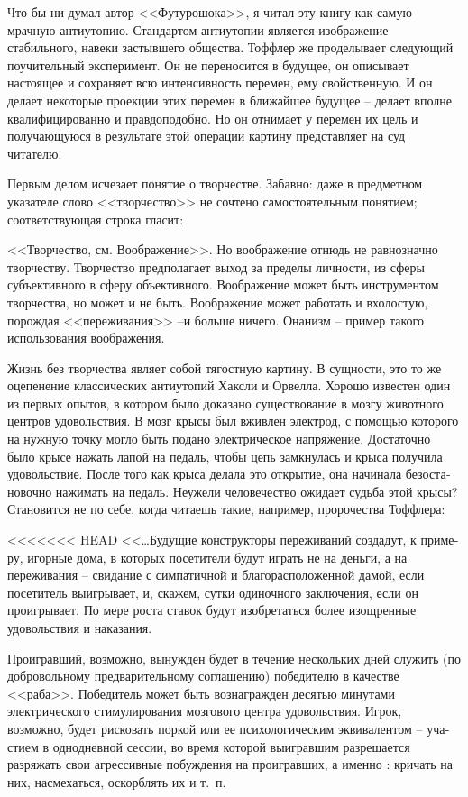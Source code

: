 \documentclass{book}
\begin{document}
{Что бы ни думал автор <<Футурошока>>, я читал эту книгу как самую мрачную антиутопию. Стандартом антиутопии являет­ся изображение стабильного, навеки застывшего общества. Тоффлер же проделывает следующий поучительный экспери­мент. Он не переносится в будущее, он описывает настоящее и сохраняет всю интенсивность перемен, ему свойственную. И он делает некоторые проекции этих перемен в ближайшее буду­щее -- делает вполне квалифицированно и правдоподобно. Но он отнимает у перемен их цель и получающуюся в результате этой операции картину представляет на суд читателю.

Первым делом исчезает понятие о творчестве. Забавно: да­же в предметном указателе слово <<творчество>> не сочтено са­мостоятельным понятием; соответствующая строка гласит:

<<Творчество,  см. Воображение>>.  Но воображение отнюдь не равнозначно творчеству. Творчество предполагает выход за пределы личности, из сферы субъективного в сферу объективного. Воображение может быть инструментом творчества, но может и не быть. Воображение может работать и вхолостую, порож­дая <<переживания>> --и больше ничего. Онанизм -- пример та­кого использования воображения.

Жизнь без творчества являет собой тягостную картину. В сущ­ности, это то же оцепенение классических антиутопий Хаксли и Орвелла. Хорошо известен один из первых опытов, в котором было доказано существование в мозгу животного центров удо­вольствия. В мозг крысы был вживлен электрод, с помощью которого на нужную точку могло быть подано электрическое напряжение. Достаточно было крысе нажать лапой на педаль, чтобы цепь замкнулась и крыса получила удовольствие. Пос­ле того как крыса делала это открытие, она начинала безоста­новочно нажимать на педаль. Неужели человечество ожидает судьба этой крысы? Становится не по себе, когда читаешь такие, например, пророчества Тоффлера:

<<<<<<< HEAD
<<\ldots Будущие конструкторы переживаний создадут, к приме­ру, игорные дома, в которых посетители будут играть не на деньги, а на переживания -- свидание с симпатичной и благо­расположенной дамой, если посетитель выигрывает, и, скажем, сутки одиночного заключения, если он проигрывает. По мере роста ставок будут изобретаться более изощренные удовольст­вия и наказания.

Проигравший, возможно, вынужден будет в течение несколь­ких дней служить (по добровольному предварительному согла­шению) победителю в качестве <<раба>>. Победитель может быть вознагражден десятью минутами электрического стимулирова­ния мозгового центра удовольствия. Игрок, возможно, будет рисковать поркой или ее психологическим эквивалентом -- уча­стием в однодневной сессии, во время которой выигравшим разрешается разряжать свои агрессивные побуждения на проиг­равших, а именно : кричать на них, насмехаться, оскорблять их и т.~п.

}
\end{document}
